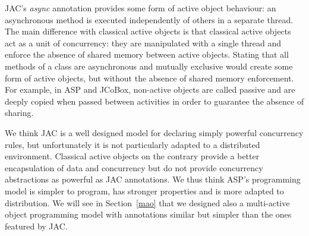 JAC's \emph{async} annotation provides some form of
active object behaviour: an asynchronous method is executed
independently of others in a separate thread. The main difference with
classical active objects is that classical active objects act as a unit of
concurrency: they are manipulated with a single thread and enforce the
absence of shared memory between active objects. Stating that all
methods of a class are asynchronous and mutually exclusive would
create some form of active objects, but without the absence of shared
memory enforcement. For example, in ASP and JCoBox, non-active objects
are called passive and are deeply copied when passed between
activities in order to guarantee the absence of sharing.

\smallskip We think JAC is a well designed model for declaring simply
powerful concurrency rules, but unfortunately it is not particularly
adapted to a distributed environment. Classical active objects on the
contrary provide a better encapsulation of data and concurrency but do
not provide concurrency abstractions as powerful as JAC annotations.
We thus think ASP's programming model is simpler to program, has
stronger properties and is more adapted to distribution. We will see
in Section~\ref{mao} that we designed also a multi-active object
programming model with annotations similar but simpler than the ones
featured by JAC.








